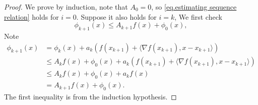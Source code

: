 \documentclass{mcom-l}
\numberwithin{equation}{section}
\begin{document}
\begin{proof}
    We prove by induction, note that $A_0 = 0$, so \eqref{eq.estimating sequence relation} holds for $i=0$. Suppose it also holds for $i=k$,
    We first check
    $$\phi_{k+1}(x)\leq A_{k+1} f(x)+\phi_0(x),$$
    Note
    \begin{equation*}
        \begin{aligned}
            \phi_{k+1}(x) & =\phi_k(x)+a_k\left (f(x_{k+1})+\langle \nabla f(x_{k+1}),x-x_{k+1}\rangle \right)               \\
                          & \leq A_k f(x)+\phi_0(x) +a_k\left (f(x_{k+1})+\langle \nabla f(x_{k+1}),x-x_{k+1}\rangle \right) \\
                          & \leq A_k f(x)+\phi_0(x) +a_k f(x)                                                                \\
                          & =A_{k+1} f(x)+\phi_0(x).
        \end{aligned}
    \end{equation*}
    The first inequality is from the induction hypothesis.


\end{proof}
\end{document}
